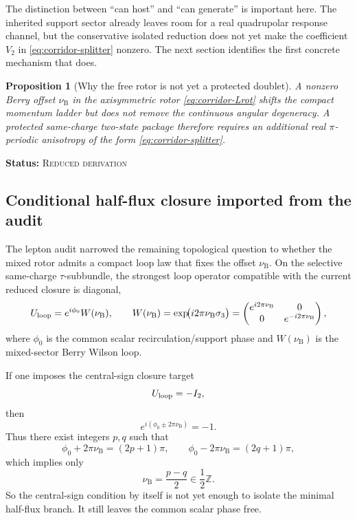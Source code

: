 \documentclass[11pt]{article}
\theoremstyle{plain}
\newtheorem{proposition}[theorem]{Proposition}
\theoremstyle{definition}
\theoremstyle{remark}
\newcommand{\statusReduced}{\textsc{Reduced derivation}}
\newcommand{\claimstatus}[1]{\par\smallskip\noindent\textbf{Status:} #1\par\smallskip}
\newcommand{\nuB}{\nu_{\mathrm{B}}}
\begin{document}
The distinction between ``can host'' and ``can generate'' is important here. The inherited support sector already leaves room for a real quadrupolar response channel, but the conservative isolated reduction does not yet make the coefficient $V_2$ in \cref{eq:corridor-splitter} nonzero. The next section identifies the first concrete mechanism that does.

\begin{proposition}[Why the free rotor is not yet a protected doublet]\label{prop:corridor-need-real-splitter}
A nonzero Berry offset $\nuB$ in the axisymmetric rotor \cref{eq:corridor-Lrot} shifts the compact momentum ladder but does not remove the continuous angular degeneracy. A protected same-charge two-state package therefore requires an additional real $\pi$-periodic anisotropy of the form \cref{eq:corridor-splitter}.
\end{proposition}
\claimstatus{\statusReduced}

\subsection{Conditional half-flux closure imported from the audit}\label{subsec:corridor-half-flux}

The lepton audit narrowed the remaining topological question to whether the mixed rotor admits a compact loop law that fixes the offset $\nuB$. On the selective same-charge $\tau$-subbundle, the strongest loop operator compatible with the current reduced closure is diagonal,
\begin{equation}
U_{\rm loop}
=
 e^{i\phi_0}W(\nuB),
\qquad
W(\nuB)
=
\exp\!\bigl(i2\pi\nuB\sigma_3\bigr)
=
\begin{pmatrix}
 e^{i2\pi\nuB} & 0 \\
 0 & e^{-i2\pi\nuB}
\end{pmatrix},
\label{eq:corridor-loop-law}
\end{equation}
where $\phi_0$ is the common scalar recirculation/support phase and $W(\nuB)$ is the mixed-sector Berry Wilson loop.

If one imposes the central-sign closure target
\begin{equation}
U_{\rm loop}=-I_2,
\label{eq:corridor-central-sign}
\end{equation}
then
\begin{equation}
e^{i(\phi_0\pm2\pi\nuB)}=-1.
\label{eq:corridor-central-sign-components}
\end{equation}
Thus there exist integers $p,q$ such that
\begin{equation}
\phi_0+2\pi\nuB=(2p+1)\pi,
\qquad
\phi_0-2\pi\nuB=(2q+1)\pi,
\label{eq:corridor-pq-system}
\end{equation}
which implies only
\begin{equation}
\nuB=\frac{p-q}{2}\in\frac12\mathbb Z.
\label{eq:corridor-halfinteger-with-phase}
\end{equation}
So the central-sign condition by itself is not yet enough to isolate the minimal half-flux branch. It still leaves the common scalar phase free.
\end{document}
